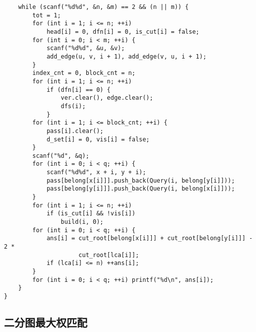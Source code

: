 \documentclass{article}
\begin{document}
\begin{lstlisting}
    while (scanf("%d%d", &n, &m) == 2 && (n || m)) {
        tot = 1;
        for (int i = 1; i <= n; ++i)
            head[i] = 0, dfn[i] = 0, is_cut[i] = false;
        for (int i = 0; i < m; ++i) {
            scanf("%d%d", &u, &v);
            add_edge(u, v, i + 1), add_edge(v, u, i + 1);
        }
        index_cnt = 0, block_cnt = n;
        for (int i = 1; i <= n; ++i)
            if (dfn[i] == 0) {
                ver.clear(), edge.clear();
                dfs(i);
            }
        for (int i = 1; i <= block_cnt; ++i) {
            pass[i].clear();
            d_set[i] = 0, vis[i] = false;
        }
        scanf("%d", &q);
        for (int i = 0; i < q; ++i) {
            scanf("%d%d", x + i, y + i);
            pass[belong[x[i]]].push_back(Query(i, belong[y[i]]));
            pass[belong[y[i]]].push_back(Query(i, belong[x[i]]));
        }
        for (int i = 1; i <= n; ++i)
            if (is_cut[i] && !vis[i])
                build(i, 0);
        for (int i = 0; i < q; ++i) {
            ans[i] = cut_root[belong[x[i]]] + cut_root[belong[y[i]]] - 2 *
                     cut_root[lca[i]];
            if (lca[i] <= n) ++ans[i];
        }
        for (int i = 0; i < q; ++i) printf("%d\n", ans[i]);
    }
}
\end{lstlisting}

\subsection{二分图最大权匹配}
\end{document}
